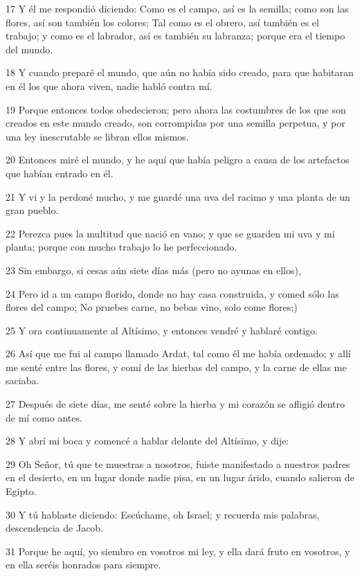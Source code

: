 \par 17 Y él me respondió diciendo: Como es el campo, así es la semilla; como son las flores, así son también los colores; Tal como es el obrero, así también es el trabajo; y como es el labrador, así es también su labranza; porque era el tiempo del mundo.
\par 18 Y cuando preparé el mundo, que aún no había sido creado, para que habitaran en él los que ahora viven, nadie habló contra mí.
\par 19 Porque entonces todos obedecieron; pero ahora las costumbres de los que son creados en este mundo creado, son corrompidas por una semilla perpetua, y por una ley inescrutable se libran ellos mismos.
\par 20 Entonces miré el mundo, y he aquí que había peligro a causa de los artefactos que habían entrado en él.
\par 21 Y vi y la perdoné mucho, y me guardé una uva del racimo y una planta de un gran pueblo.
\par 22 Perezca pues la multitud que nació en vano; y que se guarden mi uva y mi planta; porque con mucho trabajo lo he perfeccionado.
\par 23 Sin embargo, si cesas aún siete días más (pero no ayunas en ellos),
\par 24 Pero id a un campo florido, donde no hay casa construida, y comed sólo las flores del campo; No pruebes carne, no bebas vino, solo come flores;)
\par 25 Y ora continuamente al Altísimo, y entonces vendré y hablaré contigo.
\par 26 Así que me fui al campo llamado Ardat, tal como él me había ordenado; y allí me senté entre las flores, y comí de las hierbas del campo, y la carne de ellas me saciaba.
\par 27 Después de siete días, me senté sobre la hierba y mi corazón se afligió dentro de mí como antes.
\par 28 Y abrí mi boca y comencé a hablar delante del Altísimo, y dije:
\par 29 Oh Señor, tú que te muestras a nosotros, fuiste manifestado a nuestros padres en el desierto, en un lugar donde nadie pisa, en un lugar árido, cuando salieron de Egipto.
\par 30 Y tú hablaste diciendo: Escúchame, oh Israel; y recuerda mis palabras, descendencia de Jacob.
\par 31 Porque he aquí, yo siembro en vosotros mi ley, y ella dará fruto en vosotros, y en ella seréis honrados para siempre.
